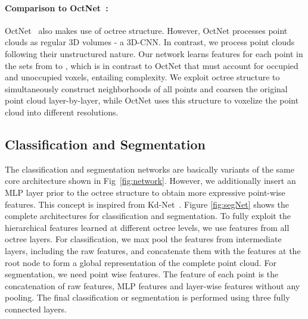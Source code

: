 \documentclass[10pt,twocolumn,letterpaper]{article}
\begin{document}
\vspace{-5mm}
{\paragraph{Comparison to OctNet~\cite{riegler2017octnet}:}   OctNet~\cite{riegler2017octnet}  also makes use of octree structure. However, OctNet processes point clouds as regular 3D volumes - a  3D-CNN.
In  contrast, we process point clouds following their  unstructured nature.
Our network  learns features  for each point in the sets from  to , which is in contrast to OctNet that must account for occupied and unoccupied voxels, entailing complexity.  
We exploit octree structure to simultaneously construct  neighborhoods of all points and coarsen the original point cloud layer-by-layer, while OctNet uses this structure to voxelize the point cloud into different resolutions.


\subsection{Classification and Segmentation}
\vspace{-2mm}
The classification and segmentation networks are basically variants of the same core architecture shown in Fig~\ref{fig:network}. 
However, we additionally insert an MLP layer prior to the octree structure to obtain more expressive point-wise features. This concept is inspired from Kd-Net~\cite{klokov2017escape}. Figure \ref{fig:segNet} shows the complete architectures for classification and segmentation. To fully exploit the hierarchical features learned at different octree levels, we use features from all octree layers. For classification, we max pool the features from intermediate layers, including the raw features, and concatenate them with the features at the root node to form a global representation of the complete point cloud. For segmentation, we need point wise features. The feature of each point is the concatenation of raw features, MLP features and layer-wise features without any pooling. The final classification or segmentation is performed using three fully connected layers.




}
\end{document}
